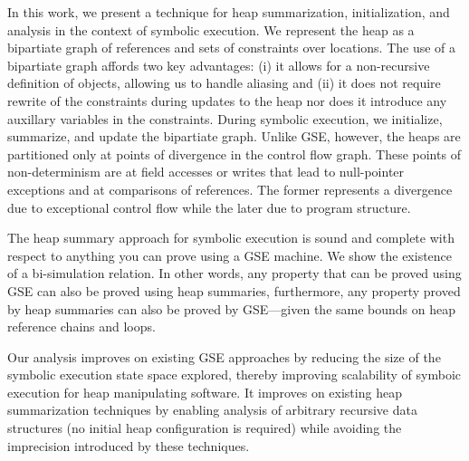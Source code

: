 In this work, we present a technique for heap summarization,
initialization, and analysis in the context of symbolic execution. We
represent the heap as a bipartiate graph of references and sets of
constraints over locations. The use of a bipartiate graph affords two
key advantages: (i) it allows for a non-recursive definition of
objects, allowing us to handle aliasing and (ii) it does not require
rewrite of the constraints during updates to the heap nor does it
introduce any auxillary variables in the constraints. During symbolic
execution, we initialize, summarize, and update the bipartiate
graph. Unlike GSE, however, the heaps are partitioned only at points
of divergence in the control flow graph. These points of
non-determinism are at field accesses or writes that lead to
null-pointer exceptions and at comparisons of references. The former
represents a divergence due to exceptional control flow while the
later due to program structure.


The heap summary approach for symbolic execution is sound and complete
with respect to anything you can prove using a GSE machine. We show
the existence of a bi-simulation relation. In other words, any
property that can be proved using GSE can also be proved using heap
summaries, furthermore, any property proved by heap summaries can also
be proved by GSE---given the same bounds on heap reference chains and
loops.



 Our analysis improves on existing GSE approaches by reducing
the size of the symbolic execution state space explored, thereby
improving scalability of symboic execution for heap manipulating
software. It improves on existing heap summarization techniques by
enabling analysis of arbitrary recursive data structures (no initial
heap configuration is required) while avoiding the imprecision
introduced by these techniques.

